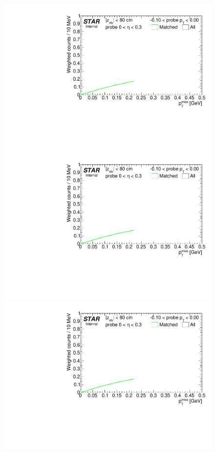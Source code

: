 \begin{figure}[h!]
{}~
\parbox{0.24\textwidth}{
  \centering
  \includegraphics[width=\linewidth,page=6]{graphics/correctionsToEff/TOF_tagAndProbe/Fitting_effVsPt_mc_ETABINS_B.CPT2.pdf}\\
  \includegraphics[width=\linewidth,page=8]{graphics/correctionsToEff/TOF_tagAndProbe/Fitting_effVsPt_mc_ETABINS_B.CPT2.pdf}\\
  \includegraphics[width=\linewidth,page=10]{graphics/correctionsToEff/TOF_tagAndProbe/Fitting_effVsPt_mc_ETABINS_B.CPT2.pdf}\\[84pt]

}%
\end{figure}


